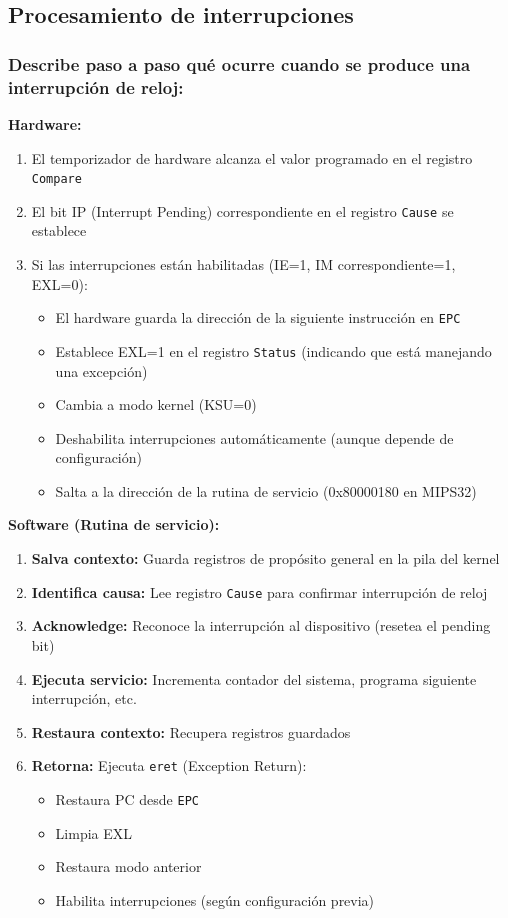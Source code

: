 \documentclass[12pt]{article}
\begin{document}
\subsection{Procesamiento de interrupciones}

\subsubsection{Describe paso a paso qué ocurre cuando se produce una interrupción de reloj:}

\textbf{Hardware:}
\begin{enumerate}
	\item El temporizador de hardware alcanza el valor programado en el registro \texttt{Compare}
	\item El bit IP (Interrupt Pending) correspondiente en el registro \texttt{Cause} se establece
	\item Si las interrupciones están habilitadas (IE=1, IM correspondiente=1, EXL=0):
	\begin{itemize}
		\item El hardware guarda la dirección de la siguiente instrucción en \texttt{EPC}
		\item Establece EXL=1 en el registro \texttt{Status} (indicando que está manejando una excepción)
		\item Cambia a modo kernel (KSU=0)
		\item Deshabilita interrupciones automáticamente (aunque depende de configuración)
		\item Salta a la dirección de la rutina de servicio (0x80000180 en MIPS32)
	\end{itemize}
\end{enumerate}

\textbf{Software (Rutina de servicio):}
\begin{enumerate}
	\item \textbf{Salva contexto:} Guarda registros de propósito general en la pila del kernel
	\item \textbf{Identifica causa:} Lee registro \texttt{Cause} para confirmar interrupción de reloj
	\item \textbf{Acknowledge:} Reconoce la interrupción al dispositivo (resetea el pending bit)
	\item \textbf{Ejecuta servicio:} Incrementa contador del sistema, programa siguiente interrupción, etc.
	\item \textbf{Restaura contexto:} Recupera registros guardados
	\item \textbf{Retorna:} Ejecuta \texttt{eret} (Exception Return):
	\begin{itemize}
		\item Restaura PC desde \texttt{EPC}
		\item Limpia EXL
		\item Restaura modo anterior
		\item Habilita interrupciones (según configuración previa)
	\end{itemize}
\end{enumerate}
\end{document}
